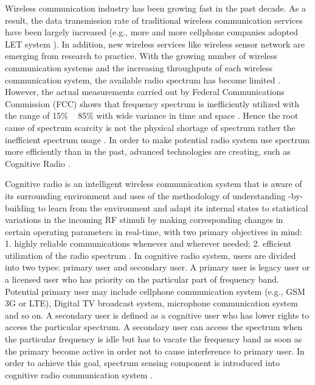 \documentclass{report}
\begin{document}
\begin{spacing}{2.0}
Wireless communication industry has been growing fast in the past decade. As a result, the data transmission rate of traditional wireless communication services have been largely increased (e.g., more and more cellphone companies adopted LET system \cite{cox2014introduction}). In addition, new wireless services like wireless sensor network are emerging from research to practice. With the growing number of wireless communication systems and the increasing throughputs of each wireless communication system, the available radio spectrum has become limited \cite{mitola1999cognitive} \cite{federal2005notice}. However, the actual measurements carried out by Federal Communications Commission (FCC) shows that frequency spectrum is inefficiently utilized with the range of 15\% ~ 85\% with wide variance in time and space \cite{nonotice}. Hence the root cause of spectrum scarcity is not the physical shortage of spectrum rather the inefficient spectrum usage \cite{umar2013comparative}. 
In order to make potential radio system use spectrum more efficiently than in the past, advanced technologies are creating, such as Cognitive Radio \cite{nonotice}.

Cognitive radio is an intelligent wireless communication system that is aware of its surrounding environment and uses of the methodology of understanding -by-building to learn from the environment and adapt its internal states to statistical variations in the incoming RF stimuli by making corresponding changes in certain operating parameters in real-time, with two primary objectives in mind: 1. highly reliable communications whenever and wherever needed; 2. efficient utilization of the radio spectrum \cite{a001}. In cognitive radio system, users are divided into two types: primary user and secondary user. A primary user is legacy user or a licensed user who has priority on the particular part of frequency band.  Potential primary user may include cellphone communication system (e.g., GSM 3G or LTE), Digital TV broadcast system, microphone communication system and so on. A secondary user is defined as a cognitive user who has lower rights to access the particular spectrum. A secondary user can access the spectrum when the particular frequency is idle but has to vacate the frequency band as soon as the primary become active in order not to cause interference to primary user. In order to achieve this goal, spectrum sensing component is introduced into cognitive radio communication system \cite{buddhikot2007understanding} \cite{tandra2009spectrum}.   


\end{spacing}
\end{document}
